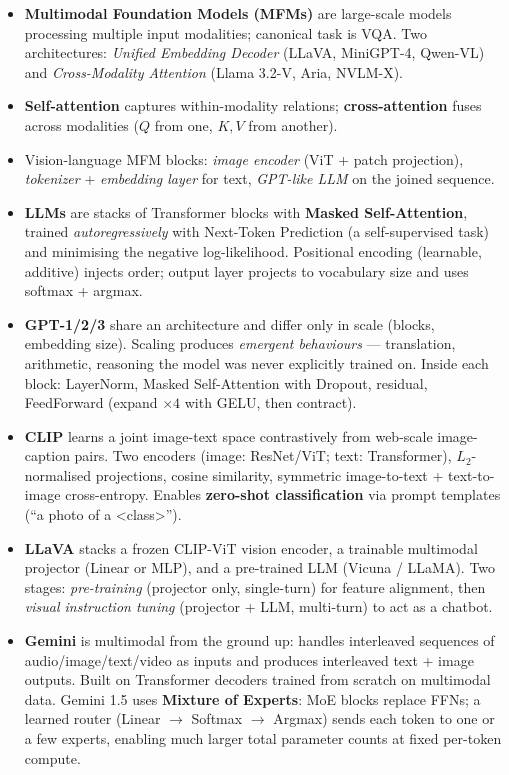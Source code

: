 \documentclass[11pt,a4paper]{article}
\theoremstyle{definition}
\theoremstyle{plain}
\theoremstyle{remark}
\begin{document}
\begin{tcolorbox}[colback=yellow!5!white,colframe=orange!80!black,title=\textbf{Take-Home Messages}]
\begin{itemize}[leftmargin=*]
    \item \textbf{Multimodal Foundation Models (MFMs)} are large-scale models processing multiple input modalities; canonical task is VQA. Two architectures: \emph{Unified Embedding Decoder} (LLaVA, MiniGPT-4, Qwen-VL) and \emph{Cross-Modality Attention} (Llama 3.2-V, Aria, NVLM-X).
    \item \textbf{Self-attention} captures within-modality relations; \textbf{cross-attention} fuses across modalities ($Q$ from one, $K, V$ from another).
    \item Vision-language MFM blocks: \emph{image encoder} (ViT + patch projection), \emph{tokenizer} + \emph{embedding layer} for text, \emph{GPT-like LLM} on the joined sequence.
    \item \textbf{LLMs} are stacks of Transformer blocks with \textbf{Masked Self-Attention}, trained \emph{autoregressively} with Next-Token Prediction (a self-supervised task) and minimising the negative log-likelihood. Positional encoding (learnable, additive) injects order; output layer projects to vocabulary size and uses softmax + argmax.
    \item \textbf{GPT-1/2/3} share an architecture and differ only in scale (blocks, embedding size). Scaling produces \emph{emergent behaviours} --- translation, arithmetic, reasoning the model was never explicitly trained on. Inside each block: LayerNorm, Masked Self-Attention with Dropout, residual, FeedForward (expand $\times 4$ with GELU, then contract).
    \item \textbf{CLIP} learns a joint image-text space contrastively from web-scale image-caption pairs. Two encoders (image: ResNet/ViT; text: Transformer), $L_2$-normalised projections, cosine similarity, symmetric image-to-text + text-to-image cross-entropy. Enables \textbf{zero-shot classification} via prompt templates (``a photo of a <class>'').
    \item \textbf{LLaVA} stacks a frozen CLIP-ViT vision encoder, a trainable multimodal projector (Linear or MLP), and a pre-trained LLM (Vicuna / LLaMA). Two stages: \emph{pre-training} (projector only, single-turn) for feature alignment, then \emph{visual instruction tuning} (projector + LLM, multi-turn) to act as a chatbot.
    \item \textbf{Gemini} is multimodal from the ground up: handles interleaved sequences of audio/image/text/video as inputs and produces interleaved text + image outputs. Built on Transformer decoders trained from scratch on multimodal data. Gemini 1.5 uses \textbf{Mixture of Experts}: MoE blocks replace FFNs; a learned router (Linear $\to$ Softmax $\to$ Argmax) sends each token to one or a few experts, enabling much larger total parameter counts at fixed per-token compute.
\end{itemize}
\end{tcolorbox}
\end{document}
